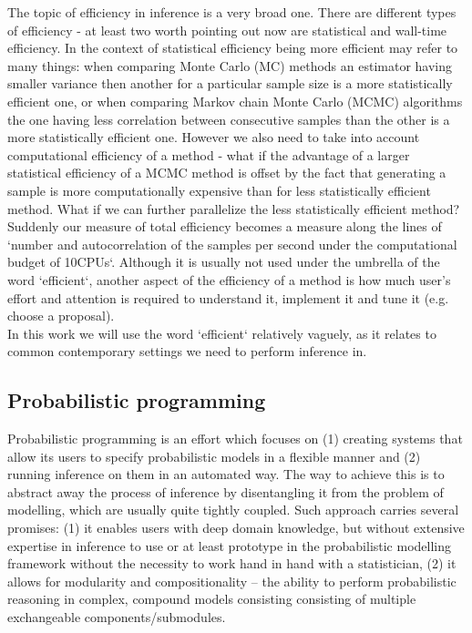 \documentclass[12pt]{article}
\begin{document}
The topic of efficiency in inference is a very broad one.
There are different types of efficiency - at least two worth pointing out now are statistical and wall-time efficiency.
In the context of statistical efficiency being more efficient may refer to many things: 
when comparing Monte Carlo (MC) methods an estimator having smaller variance then another for a particular sample size is a more statistically efficient one, or
when comparing Markov chain Monte Carlo (MCMC) algorithms the one having less correlation between consecutive samples than the other is a more statistically efficient one.
However we also need to take into account computational efficiency of a method - what if the advantage of a larger statistical efficiency of a MCMC method is offset by the fact that generating a sample is more computationally expensive than for less statistically efficient method.
What if we can further parallelize the less statistically efficient method?
Suddenly our measure of total efficiency becomes a measure along the lines of `number and autocorrelation of the samples per second under the computational budget of 10CPUs`.
Although it is usually not used under the umbrella of the word `efficient`, another aspect of the efficiency of a method is how much user's effort and attention is required to understand it, implement it and tune it (e.g. choose a proposal).\\
In this work we will use the word `efficient` relatively vaguely, as it relates to common contemporary settings we need to perform inference in.




\subsection{Probabilistic programming}
Probabilistic programming is an effort which focuses on 
(1) creating systems that allow its users to specify probabilistic models in a flexible manner 
and 
(2) running inference on them in an automated way.
The way to achieve this is to abstract away the process of inference by disentangling it from the problem of modelling, which are usually quite tightly coupled.
Such approach carries several promises:
(1) it enables users with deep domain knowledge, but without extensive expertise in inference to use or at least prototype in the probabilistic modelling framework without the necessity to work hand in hand with a statistician,
(2) it allows for modularity and compositionality -- the ability to perform probabilistic reasoning in complex, compound models consisting consisting of multiple exchangeable components/submodules.
\end{document}
